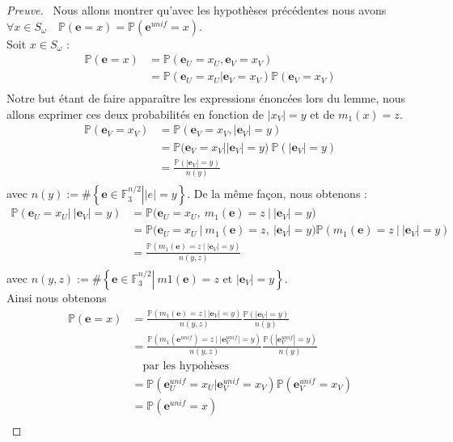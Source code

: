 \documentclass[12pt]{article}
\theoremstyle{plain}
\theoremstyle{definition}
\newcommand{\F}{\mathbb{F}}
\newcommand{\e}{\mathbf{e}}
\begin{document}
\begin{proof}[Preuve]\
Nous allons montrer qu'avec les hypothèses précédentes nous avons $\forall x \in S_{\omega} \quad \mathbb{P}(\e = x) = \mathbb{P}(\e^{unif} = x)$.\\
Soit $x \in S_{\omega}$ :
\begin{equation*}
\begin{split}
\mathbb{P}(\e = x) &= \mathbb{P}(\e_U = x_U, \e_V = x_V)\\
&= \mathbb{P}(\e_U = x_U | \e_V = x_V)\mathbb{P}(\e_V = x_V)\\
\end{split}
\end{equation*}
Notre but étant de faire apparaître les expressions énoncées lors du lemme, nous allons exprimer ces deux probabilités en fonction de $|x_V| = y$ et de $m_1(x) = z$.
\begin{equation*}
\begin{split}
\mathbb{P}(\e_V = x_V) &= \mathbb{P}(\e_V = x_V, |\e_V| = y)\\
&= \left.\mathbb{P}(\e_V = x_V \right| |\e_V| = y)\ \mathbb{P}(|\e_V| = y)\\
&= \frac{\mathbb{P}(|\e_V| = y)}{n(y)}\\
\end{split}
\end{equation*}
avec $n(y) := \#\left\{ \left.\e \in \F_3^{n/2} \right| |e| = y\right\}$.
De la même façon, nous obtenons :
{\footnotesize \begin{equation*}
\begin{split}
\mathbb{P}(\e_U = x_U |\ |\e_V| = y) &= \left.\mathbb{P}(\e_U = x_U ,\ m_1(\e) = z\ \right|\ |\e_V| = y)\\
&= \left.\mathbb{P}(\e_U = x_U\ \right|\ m_1(\e) = z,\ |\e_V| = y)\mathbb{P}(m_1(\e) = z\ |\ |\e_V| = y)\\
&= \frac{\mathbb{P}(m_1(\e) = z\ |\ |\e_V| = y)}{n(y,z)}\\
\end{split}
\end{equation*}}
avec $n(y,z) := \#\left\{ \left.\e \in \F_3^{n/2} \right|\  m1(\e) = z\text{ et } |\e_V| = y \right\}$.\\

\noindent Ainsi nous obtenons
\begin{equation*}
\begin{split}
\mathbb{P}(\e = x) &= \frac{\mathbb{P}(m_1(\e) = z\ |\ |\e_V| = y)}{n(y,z)}\frac{\mathbb{P}(|\e_V| = y)}{n(y)}\\
 &= \frac{\mathbb{P}(m_1(\e^{unif}) = z\ |\ |\e_V^{unif}| = y)}{n(y,z)}\frac{\mathbb{P}(|\e_V^{unif}| = y)}{n(y)}\\
 &\quad \text{par les hypohèses}\\
 &= \mathbb{P}(\e_U^{unif} = x_U | \e_V^{unif} = x_V)\mathbb{P}(\e_V^{unif} = x_V)\\
 &= \mathbb{P}(\e^{unif} = x)\\
\end{split}
\end{equation*}
\end{proof}
\end{document}
